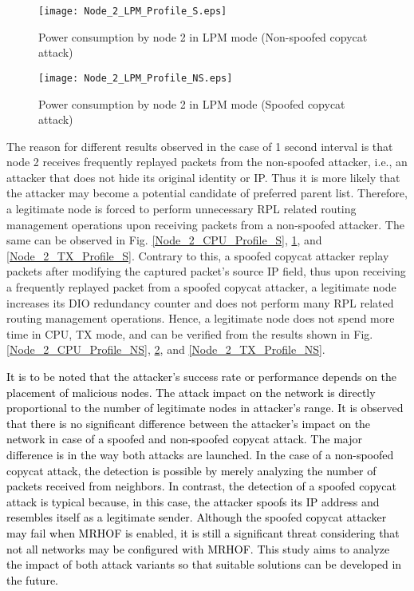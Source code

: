 \documentclass[]{svjour3}                     %
\begin{document}
\begin{figure}[!h]
	\centering
	\texttt{[image: Node\_2\_LPM\_Profile\_S.eps]}
	\caption{Power consumption by node 2 in LPM mode (Non-spoofed copycat attack)}
	\label{Node_2_LPM_Profile_S}
\end{figure}

\begin{figure}[!h]
	\centering
	\texttt{[image: Node\_2\_LPM\_Profile\_NS.eps]}
	\caption{Power consumption by node 2 in LPM mode (Spoofed copycat attack)}
	\label{Node_2_LPM_Profile_NS}
\end{figure}


The reason for different results observed in the case of 1 second interval is that node 2 receives frequently replayed packets from the non-spoofed attacker, i.e., an attacker that does not hide its original identity or IP. Thus it is more likely that the attacker may become a potential candidate of preferred parent list. Therefore, a legitimate node is forced to perform unnecessary RPL related routing management operations upon receiving packets from a non-spoofed attacker. The same can be observed in Fig. \ref{Node_2_CPU_Profile_S}, \ref{Node_2_LPM_Profile_S}, and \ref{Node_2_TX_Profile_S}. Contrary to this, a spoofed copycat attacker replay packets after modifying the captured packet's source IP field, thus upon receiving a frequently replayed packet from a spoofed copycat attacker, a legitimate node increases its DIO redundancy counter and does not perform many RPL related routing management operations. Hence, a legitimate node does not spend more time in CPU, TX mode, and can be verified from the results shown in Fig. \ref{Node_2_CPU_Profile_NS}, \ref{Node_2_LPM_Profile_NS}, and \ref{Node_2_TX_Profile_NS}. 

\textcolor{black}{It is to be noted that the attacker’s success rate or performance depends on the placement of malicious nodes. The attack impact on the network is directly proportional to the number of legitimate nodes in attacker's range. It is observed that there is no significant difference between the attacker's impact on the network in case of a spoofed and non-spoofed copycat attack. The major difference is in the way both attacks are launched. In the case of a non-spoofed copycat attack, the detection is possible by merely analyzing the number of packets received from neighbors. In contrast, the detection of a spoofed copycat attack is typical because, in this case, the attacker spoofs its IP address and resembles itself as a legitimate sender. Although the spoofed copycat attacker may fail when MRHOF is enabled, it is still a significant threat considering that not all networks may be configured with MRHOF.  This study aims to analyze the impact of both attack variants so that suitable solutions can be developed in the future.} 
\end{document}
